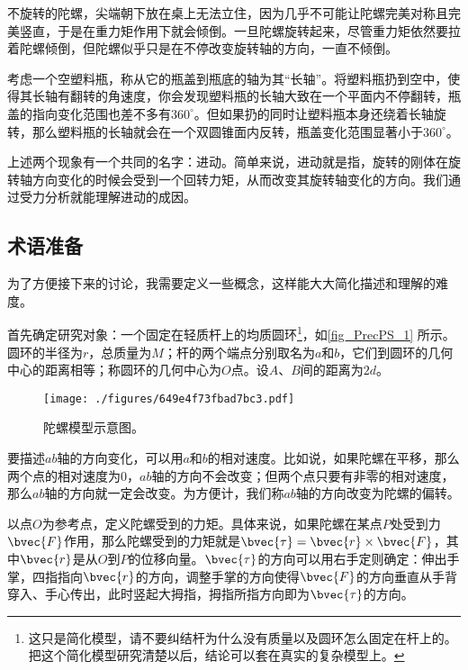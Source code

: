 

不旋转的陀螺，尖端朝下放在桌上无法立住，因为几乎不可能让陀螺完美对称且完美竖直，于是在重力矩作用下就会倾倒。一旦陀螺旋转起来，尽管重力矩依然要拉着陀螺倾倒，但陀螺似乎只是在不停改变旋转轴的方向，一直不倾倒。

考虑一个空塑料瓶，称从它的瓶盖到瓶底的轴为其“长轴”。将塑料瓶扔到空中，使得其长轴有翻转的角速度，你会发现塑料瓶的长轴大致在一个平面内不停翻转，瓶盖的指向变化范围也差不多有$360^\circ$。但如果扔的同时让塑料瓶本身还绕着长轴旋转，那么塑料瓶的长轴就会在一个双圆锥面内反转，瓶盖变化范围显著小于$360^\circ$。

上述两个现象有一个共同的名字：进动。简单来说，进动就是指，旋转的刚体在旋转轴方向变化的时候会受到一个回转力矩，从而改变其旋转轴变化的方向。我们通过受力分析就能理解进动的成因。


\subsection{术语准备}


为了方便接下来的讨论，我需要定义一些概念，这样能大大简化描述和理解的难度。


首先确定研究对象：一个固定在轻质杆上的均质圆环\footnote{这只是简化模型，请不要纠结杆为什么没有质量以及圆环怎么固定在杆上的。把这个简化模型研究清楚以后，结论可以套在真实的复杂模型上。}，如\autoref{fig_PrecPS_1} 所示。圆环的半径为$r$，总质量为$M$；杆的两个端点分别取名为$a$和$b$，它们到圆环的几何中心的距离相等；称圆环的几何中心为$O$点。设$A$、$B$间的距离为$2d$。

\begin{figure}[ht]
\centering
\texttt{[image: ./figures/649e4f73fbad7bc3.pdf]}
\caption{陀螺模型示意图。} \label{fig_PrecPS_1}
\end{figure}


要描述$ab$轴的方向变化，可以用$a$和$b$的相对速度。比如说，如果陀螺在平移，那么两个点的相对速度为$0$，$ab$轴的方向不会改变；但两个点只要有非零的相对速度，那么$ab$轴的方向就一定会改变。为方便计，我们称$ab$轴的方向改变为陀螺的偏转。


以点$O$为参考点，定义陀螺受到的力矩。具体来说，如果陀螺在某点$P$处受到力$\bvec{F}$作用，那么陀螺受到的力矩就是$\bvec{\tau}=\bvec{r}\times \bvec{F}$，其中$\bvec{r}$是从$O$到$P$的位移向量。$\bvec{\tau}$的方向可以用右手定则确定：伸出手掌，四指指向$\bvec{r}$的方向，调整手掌的方向使得$\bvec{F}$的方向垂直从手背穿入、手心传出，此时竖起大拇指，拇指所指方向即为$\bvec{\tau}$的方向。


